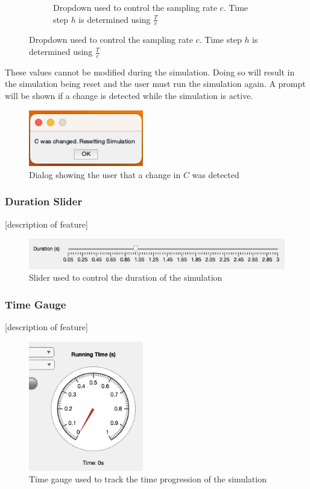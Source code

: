 \begin{figure}[H]
\begin{subfigure}[b]{0.3\textwidth}
     	\caption{Dropdown used to control the sampling rate $c$. Time step $h$ is determined using $\frac{T}{c}$}
     \end{subfigure}
     \hfill
\end{figure}
These values cannot be modified during the simulation. Doing so will result in the simulation being reset and the user must run the simulation again. A prompt will be shown if a change is detected while the simulation is active.
\begin{figure}[H]
     \centering
     \includegraphics[width=5cm]{graphics/visualisation/dialog_cchange}
     \caption{Dialog showing the user that a change in $C$ was detected}
\end{figure}

\subsubsection{Duration Slider} [description of feature]

\begin{figure}[H]
    \centering
   	\includegraphics[width=\textwidth]{graphics/visualisation/ui_input_duration}
	\caption{Slider used to control the duration of the simulation}
\end{figure}

\subsubsection{Time Gauge} [description of feature]
\begin{figure}[H]
    \centering
   	\includegraphics[width=5cm]{graphics/visualisation/ui_indicator_gage}
	\caption{Time gauge used to track the time progression of the simulation}
\end{figure}

